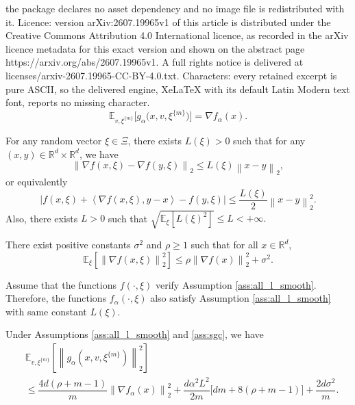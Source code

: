 \documentclass[10pt,a4paper]{amsart}
\newcommand{\Ec}[2]{\mathbb{E}_{#2}\left[#1 \right]}
\newcommand{\Ecbig}[2]{\mathbb{E}_{#2}\Bigg[#1 \Bigg]}
\def\R{{\mathbb{R}}}
\newcommand{\dotprod}[1]{\left< #1\right>}
\def\gest{{g_\alpha}}
\newcommand{\norm}[1]{\left\lVert#1\right\rVert_{2}}
\def\vest{{v}}
\def\xiest{{\xi^{\{m\}}}}
\begin{document}
the package declares no asset dependency and no image file is redistributed with it. Licence: version arXiv:2607.19965v1 of this article is distributed under the Creative Commons Attribution 4.0 International licence, as recorded in the arXiv licence metadata for this exact version and shown on the abstract page https://arxiv.org/abs/2607.19965v1. A full rights notice is delivered at licenses/arxiv-2607.19965-CC-BY-4.0.txt. Characters: every retained excerpt is pure ASCII, so the delivered engine, XeLaTeX with its default Latin Modern text font, reports no missing character.
    \begin{equation}\label{eq:unbiased_prop_g_xi_alpha}
    \Ecbig{\gest\Big(x,v,\xiest\Big)}{v,\xiest}=\nabla f_\alpha(x).
\end{equation}

\begin{assumption}\label{ass:all_l_smooth}
For any random vector $\xi \in \Xi$, there exists $L(\xi)>0$ such that for any $(x,y) \in \R^d \times \R^d$, we have
\[\norm{\nabla f(x,\xi)-\nabla f(y,\xi)} \le L(\xi)\norm{x-y},\] or equivalently 
    \[\vert f(x,\xi) + \dotprod{\nabla f(x,\xi),y-x} - f(y,\xi) \vert\le \frac{L(\xi)}{2}\norm{x-y}^2.\] Also, there exists $L>0$ such that $\sqrt{\Ec{L(\xi)^2}{\xi}}\leq L <+\infty.$
\end{assumption}

\begin{assumption}\label{ass:sgc}
There exist positive constants $\sigma^2$ and $\rho\geq 1$ such that for all $x\in \R^d$,
    \begin{equation*}
        \mathbb{E}_{\xi}\left[ \norm{\nabla f(x,\xi)}^2 \right] \leq \rho \norm{\nabla f(x)}^2 + \sigma^2.
    \end{equation*}
    
\end{assumption}

\begin{lemma}\label{lem:function_lipschitz_transferv1}
    Assume that the functions $f(\cdot,\xi)$ verify Assumption \ref{ass:all_l_smooth}. Therefore, the functions $f_\alpha(\cdot,\xi)$ also satisfy Assumption \ref{ass:all_l_smooth} with same constant $L(\xi)$.
\end{lemma}

\begin{lemma}\label{lem:g_sphere_bound}
Under Assumptions \ref{ass:all_l_smooth} and \ref{ass:sgc}, we have
\begin{equation*}
    \begin{aligned}
        &\Ec{\norm{\gest\left(x,\vest,\xiest\right)}^2}{v,\xiest}\\
        &\leq \dfrac{4d(\rho+m-1)}{m}\norm{\nabla f_\alpha(x)}^2+\dfrac{d\alpha^2L^2}{2m}\Big[dm+8(\rho+m-1)\Big]+\dfrac{2d\sigma^2}{m}.
    \end{aligned}
\end{equation*}
\end{lemma}
\end{document}
